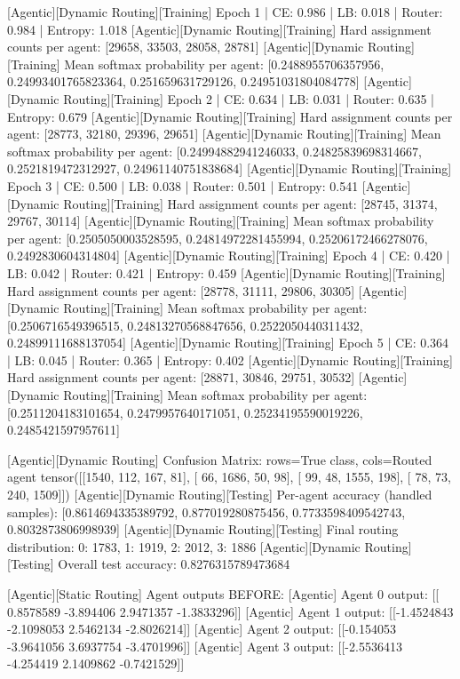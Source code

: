 [Agentic][Dynamic Routing][Training] Epoch 1 | CE: 0.986 | LB: 0.018 | Router: 0.984 | Entropy: 1.018
[Agentic][Dynamic Routing][Training] Hard assignment counts per agent: [29658, 33503, 28058, 28781]
[Agentic][Dynamic Routing][Training] Mean softmax probability per agent: [0.2488955706357956, 0.24993401765823364, 0.251659631729126, 0.24951031804084778]
[Agentic][Dynamic Routing][Training] Epoch 2 | CE: 0.634 | LB: 0.031 | Router: 0.635 | Entropy: 0.679
[Agentic][Dynamic Routing][Training] Hard assignment counts per agent: [28773, 32180, 29396, 29651]
[Agentic][Dynamic Routing][Training] Mean softmax probability per agent: [0.24994882941246033, 0.24825839698314667, 0.2521819472312927, 0.24961140751838684]
[Agentic][Dynamic Routing][Training] Epoch 3 | CE: 0.500 | LB: 0.038 | Router: 0.501 | Entropy: 0.541
[Agentic][Dynamic Routing][Training] Hard assignment counts per agent: [28745, 31374, 29767, 30114]
[Agentic][Dynamic Routing][Training] Mean softmax probability per agent: [0.2505050003528595, 0.24814972281455994, 0.25206172466278076, 0.2492830604314804]
[Agentic][Dynamic Routing][Training] Epoch 4 | CE: 0.420 | LB: 0.042 | Router: 0.421 | Entropy: 0.459
[Agentic][Dynamic Routing][Training] Hard assignment counts per agent: [28778, 31111, 29806, 30305]
[Agentic][Dynamic Routing][Training] Mean softmax probability per agent: [0.2506716549396515, 0.24813270568847656, 0.2522050440311432, 0.24899111688137054]
[Agentic][Dynamic Routing][Training] Epoch 5 | CE: 0.364 | LB: 0.045 | Router: 0.365 | Entropy: 0.402
[Agentic][Dynamic Routing][Training] Hard assignment counts per agent: [28871, 30846, 29751, 30532]
[Agentic][Dynamic Routing][Training] Mean softmax probability per agent: [0.2511204183101654, 0.2479957640171051, 0.25234195590019226, 0.2485421597957611]

[Agentic][Dynamic Routing] Confusion Matrix: rows=True class, cols=Routed agent
tensor([[1540,  112,  167,   81],
[  66, 1686,   50,   98],
[  99,   48, 1555,  198],
[  78,   73,  240, 1509]])
[Agentic][Dynamic Routing][Testing] Per-agent accuracy (handled samples): [0.8614694335389792, 0.877019280875456, 0.7733598409542743, 0.8032873806998939]
[Agentic][Dynamic Routing][Testing] Final routing distribution: {0: 1783, 1: 1919, 2: 2012, 3: 1886}
[Agentic][Dynamic Routing][Testing] Overall test accuracy: 0.8276315789473684

[Agentic][Static Routing] Agent outputs BEFORE:
[Agentic] Agent 0 output: [[ 0.8578589 -3.894406   2.9471357 -1.3833296]]
[Agentic] Agent 1 output: [[-1.4524843 -2.1098053  2.5462134 -2.8026214]]
[Agentic] Agent 2 output: [[-0.154053  -3.9641056  3.6937754 -3.4701996]]
[Agentic] Agent 3 output: [[-2.5536413 -4.254419   2.1409862 -0.7421529]]

